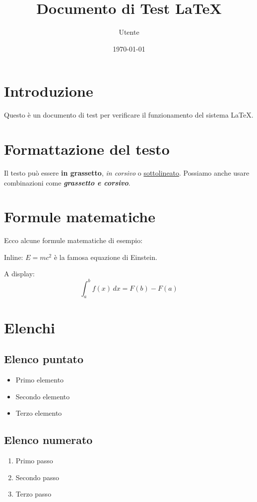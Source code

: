 \documentclass[12pt,a4paper]{article}
\title{Documento di Test LaTeX}
\author{Utente}
\date{\today}
\begin{document}
\maketitle

\section{Introduzione}
Questo è un documento di test per verificare il funzionamento del sistema LaTeX.

\section{Formattazione del testo}
Il testo può essere \textbf{in grassetto}, \textit{in corsivo} o \underline{sottolineato}.
Possiamo anche usare combinazioni come \textit{\textbf{grassetto e corsivo}}.

\section{Formule matematiche}
Ecco alcune formule matematiche di esempio:

Inline: $E=mc^2$ è la famosa equazione di Einstein.

A display:
\begin{equation}
    \int_{a}^{b} f(x) \, dx = F(b) - F(a)
\end{equation}

\section{Elenchi}

\subsection{Elenco puntato}
\begin{itemize}
    \item Primo elemento
    \item Secondo elemento
    \item Terzo elemento
\end{itemize}

\subsection{Elenco numerato}
\begin{enumerate}
    \item Primo passo
    \item Secondo passo
    \item Terzo passo
\end{enumerate}
\end{document}
